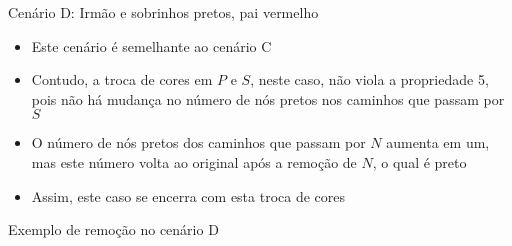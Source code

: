\begin{frame}[fragile]{Cenário D: Irmão e sobrinhos pretos, pai vermelho}

    \begin{itemize}
        \item Este cenário é semelhante ao cenário C

        \item Contudo, a troca de cores em $P$ e $S$, neste caso, não viola a propriedade 5,
            pois não há mudança no número de nós pretos nos caminhos que passam por $S$

        \item O número de nós pretos dos caminhos que passam por $N$ aumenta em um, mas este
            número volta ao original após a remoção de $N$, o qual é preto

        \item Assim, este caso se encerra com esta troca de cores
    \end{itemize}

\end{frame}

\begin{frame}[fragile]{Exemplo de remoção no cenário D}


\end{frame}

